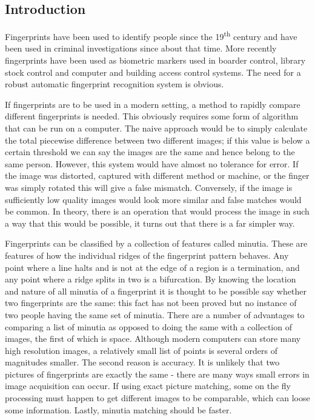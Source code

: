 \documentclass[11pt,a4paper]{article}
\begin{document}
    \begin{multicols}{2}

\section{Introduction}
	Fingerprints have been used to identify people since the 19\textsuperscript{th} century and have been used in criminal investigations since about that time. More recently fingerprints have been used as biometric markers used in boarder control, library stock control and computer and building access control systems. The need for a robust automatic fingerprint recognition system is obvious.

        If fingerprints are to be used in a modern setting, a method to rapidly compare different fingerprints is needed. This obviously requires some form of algorithm that can be run on a computer. The naive approach would be to simply calculate the total piecewise difference between two different images; if this value is below a certain threshold we can say the images are the same and hence belong to the same person. However, this system would have almost no tolerance for error. If the image was distorted, captured with different method or machine, or the finger was simply rotated this will give a false mismatch. Conversely, if the image is sufficiently low quality images would look more similar and false matches would be common. In theory, there is an operation that would process the image in such a way that this would be possible, it turns out that there is a far simpler way.

        Fingerprints can be classified by a collection of features called minutia\supercite{ANSI}. These are features of how the individual ridges of the fingerprint pattern behaves. Any point where a line halts and is not at the edge of a region is a termination, and any point where a ridge splits in two is a bifurcation. By knowing the location and nature of all minutia of a fingerprint it is thought to be possible say whether two fingerprints are the same: this fact has not been proved but no instance of two people having the same set of minutia. There are a number of advantages to comparing a list of minutia as opposed to doing the same with a collection of images, the first of which is space. Although modern computers can store many high resolution images, a relatively small list of points is several orders of magnitudes smaller. The second reason is accuracy. It is unlikely that two pictures of fingerprints are exactly the same - there are many ways small errors in image acquisition can occur. If using exact picture matching, some on the fly processing must happen to get different images to be comparable, which can loose some information. Lastly, minutia matching should be faster.



\end{multicols}
\end{document}

